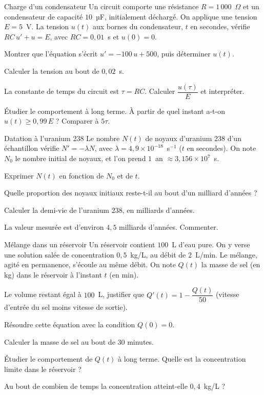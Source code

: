 \begin{exercice}[2]{Charge d'un condensateur}
Un circuit comporte une résistance $R=1\,000$~$\Omega$ et un condensateur de capacité $10$~µF, initialement déchargé. On
applique une tension $E=5$~V. La tension $u(t)$ aux bornes du condensateur, $t$ en secondes, vérifie $RC\,u'+u=E$, avec
$RC=0{,}01$~s et $u(0)=0$.
\begin{questions}
  \item Montrer que l'équation s'écrit $u'=-100\,u+500$, puis déterminer $u(t)$.
  \item Calculer la tension au bout de $0{,}02$~s.
  \item La constante de temps du circuit est $\tau=RC$. Calculer $\dfrac{u(\tau)}{E}$ et interpréter.
  \item Étudier le comportement à long terme. À partir de quel instant a-t-on $u(t)\geq0{,}99\,E$ ? Comparer à $5\tau$.
\end{questions}
\end{exercice}

\begin{exercice}[2]{Datation à l'uranium 238}
Le nombre $N(t)$ de noyaux d'uranium 238 d'un échantillon vérifie $N'=-\lambda N$, avec $\lambda=4{,}9\times10^{-18}$~s$^{-1}$
($t$ en secondes). On note $N_0$ le nombre initial de noyaux, et l'on prend $1$~an $\approx3{,}156\times10^{7}$~s.
\begin{questions}
  \item Exprimer $N(t)$ en fonction de $N_0$ et de $t$.
  \item Quelle proportion des noyaux initiaux reste-t-il au bout d'un milliard d'années ?
  \item Calculer la demi-vie de l'uranium 238, en milliards d'années.
  \item La valeur mesurée est d'environ $4{,}5$ milliards d'années. Commenter.
\end{questions}
\end{exercice}


\begin{exercice}[3]{Mélange dans un réservoir}
Un réservoir contient $100$~L d'eau pure. On y verse une solution salée de concentration $0{,}5$~kg/L, au débit de
$2$~L/min. Le mélange, agité en permanence, s'écoule au même débit. On note $Q(t)$ la masse de sel (en kg) dans le réservoir
à l'instant $t$ (en min).
\begin{questions}
  \item Le volume restant égal à $100$~L, justifier que $Q'(t)=1-\dfrac{Q(t)}{50}$ (vitesse d'entrée du sel moins vitesse de sortie).
  \item Résoudre cette équation avec la condition $Q(0)=0$.
  \item Calculer la masse de sel au bout de $30$ minutes.
  \item Étudier le comportement de $Q(t)$ à long terme. Quelle est la concentration limite dans le réservoir ?
  \item Au bout de combien de temps la concentration atteint-elle $0{,}4$~kg/L ?
\end{questions}
\end{exercice}

